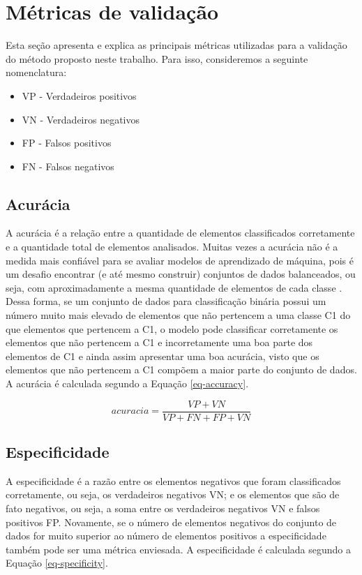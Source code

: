 \section{Métricas de validação}
Esta seção apresenta e explica as principais métricas utilizadas para a validação do método proposto neste trabalho.
Para isso, consideremos a seguinte nomenclatura:

 \begin{itemize}
   \item VP - Verdadeiros positivos
   \item VN - Verdadeiros negativos
   \item FP - Falsos positivos
   \item FN - Falsos negativos
 \end{itemize}
   
\subsection{Acurácia}
A acurácia é a relação entre a quantidade de elementos classificados corretamente e a quantidade total de elementos analisados. Muitas vezes a acurácia não é a medida mais confiável para se avaliar modelos de aprendizado de máquina, pois é um desafio encontrar (e até mesmo construir) conjuntos de dados balanceados, ou seja, com aproximadamente a mesma quantidade de elementos de cada classe \cite{9075071}. Dessa forma, se um conjunto de dados para classificação binária possui um número muito mais elevado de elementos que não pertencem a uma classe C1 do que elementos que pertencem a C1, o modelo pode classificar corretamente os elementos que não pertencem a C1 e incorretamente uma boa parte dos elementos de C1 e ainda assim apresentar uma boa acurácia, visto que os elementos que não pertencem a C1 compõem a maior parte do conjunto de dados. 
A acurácia é calculada segundo a Equação \ref{eq-accuracy}.

\begin{equation}
acuracia = \frac{VP + VN}{VP + FN + FP + VN}
\label{eq-accuracy}
\end{equation}

\subsection{Especificidade}
A especificidade é a razão entre os elementos negativos que foram classificados corretamente, ou seja, os verdadeiros negativos VN; e os elementos que são de fato negativos, ou seja, a soma entre os verdadeiros negativos VN e falsos positivos FP.
Novamente, se o número de elementos negativos do conjunto de dados for muito superior ao número de elementos positivos a especificidade também pode ser uma métrica enviesada. 
A especificidade é calculada segundo a Equação \ref{eq-specificity}.

